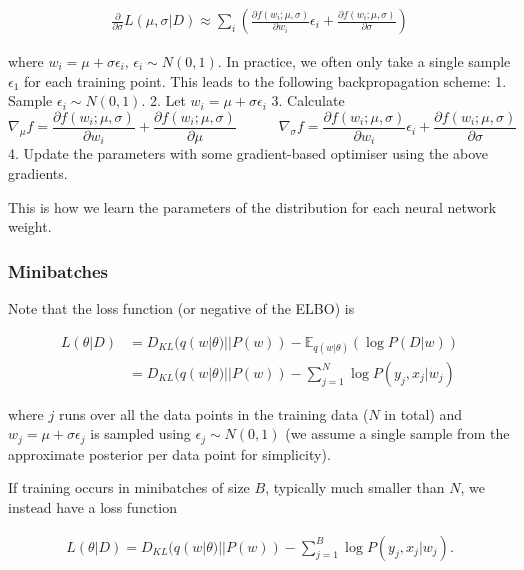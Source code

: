 \documentclass[11pt]{article}
\begin{document}
\[
\begin{align}
\frac{\partial}{\partial \sigma} L(\mu, \sigma | D) \approx \sum_{i} \left( \frac{\partial f(w_i; \mu, \sigma)}{\partial w_i} \epsilon_i + \frac{\partial f(w_i; \mu, \sigma)}{\partial \sigma} \right)
\end{align}
\]

where \(w_i = \mu + \sigma \epsilon_i, \, \epsilon_i \sim N(0, 1)\). In
practice, we often only take a single sample \(\epsilon_1\) for each
training point. This leads to the following backpropagation scheme: 1.
Sample \(\epsilon_i \sim N(0, 1)\). 2. Let
\(w_i = \mu + \sigma \epsilon_i\) 3. Calculate \[
\nabla_{\mu}f = \frac{\partial f(w_i; \mu, \sigma)}{\partial w_i} + \frac{\partial f(w_i; \mu, \sigma)}{\partial \mu} \hspace{3em} \nabla_{\sigma}f = \frac{\partial f(w_i; \mu, \sigma)}{\partial w_i} \epsilon_i + \frac{\partial f(w_i; \mu, \sigma)}{\partial \sigma}
\] 4. Update the parameters with some gradient-based optimiser using the
above gradients.

This is how we learn the parameters of the distribution for each neural
network weight.

    \hypertarget{minibatches}{%
\subsubsection{Minibatches}\label{minibatches}}

Note that the loss function (or negative of the ELBO) is

\[
\begin{align}
L(\theta | D) &= D_{KL} ( q(w | \theta) || P(w) ) - \mathbb{E}_{q(w | \theta)}(\log P(D | w)) \\
& = D_{KL} ( q(w | \theta) || P(w) ) - \sum_{j=1}^N \log P(y_j, x_j | w_j)
\end{align}
\]

where \(j\) runs over all the data points in the training data (\(N\) in
total) and \(w_j = \mu + \sigma \epsilon_j\) is sampled using
\(\epsilon_j \sim N(0, 1)\) (we assume a single sample from the
approximate posterior per data point for simplicity).

If training occurs in minibatches of size \(B\), typically much smaller
than \(N\), we instead have a loss function

\[
\begin{align}
L(\theta | D) = D_{KL} ( q(w | \theta) || P(w) ) - \sum_{j=1}^{B} \log P(y_j, x_j | w_j).
\end{align}
\]
\end{document}
